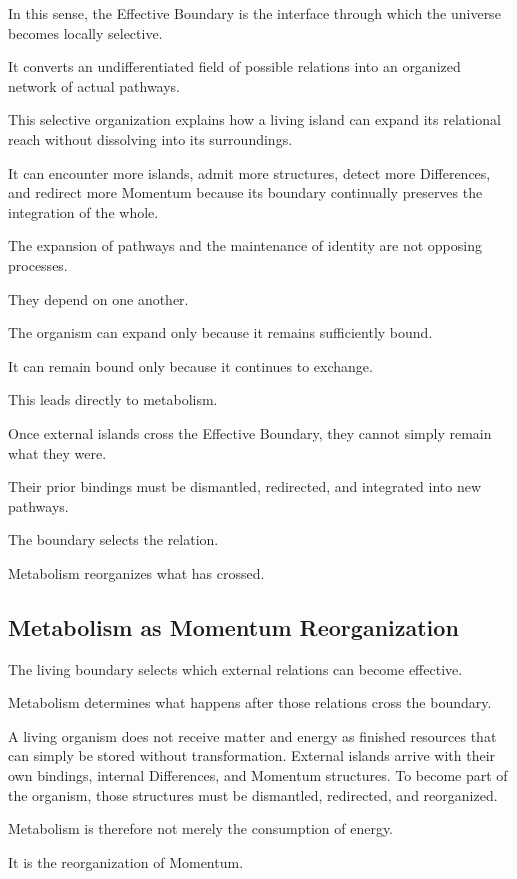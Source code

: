 In this sense, the Effective Boundary is the interface through which the universe becomes locally selective.

It converts an undifferentiated field of possible relations into an organized network of actual pathways.

This selective organization explains how a living island can expand its relational reach without dissolving into its surroundings.

It can encounter more islands, admit more structures, detect more Differences, and redirect more Momentum because its boundary continually preserves the integration of the whole.

The expansion of pathways and the maintenance of identity are not opposing processes.

They depend on one another.

The organism can expand only because it remains sufficiently bound.

It can remain bound only because it continues to exchange.

This leads directly to metabolism.

Once external islands cross the Effective Boundary, they cannot simply remain what they were.

Their prior bindings must be dismantled, redirected, and integrated into new pathways.

The boundary selects the relation.

Metabolism reorganizes what has crossed.

\subsection*{\textbf{Metabolism as Momentum Reorganization}}

The living boundary selects which external relations can become effective.

Metabolism determines what happens after those relations cross the boundary.

A living organism does not receive matter and energy as finished resources that can simply be stored without transformation. External islands arrive with their own bindings, internal Differences, and Momentum structures. To become part of the organism, those structures must be dismantled, redirected, and reorganized.

Metabolism is therefore not merely the consumption of energy.

It is the reorganization of Momentum.

